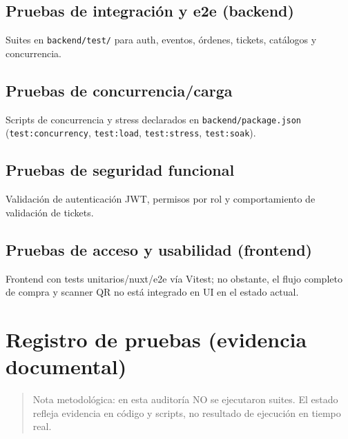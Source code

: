 \documentclass[
  11pt,
  a4paper,
  twoside=false,
  parskip=half               %
]{scrreprt}                  %
\begin{document}
\hypertarget{pruebas-de-integraciuxf3n-y-e2e-backend}{%
\subsection{Pruebas de integración y e2e
(backend)}\label{pruebas-de-integraciuxf3n-y-e2e-backend}}

Suites en \texttt{backend/test/} para auth, eventos, órdenes, tickets,
catálogos y concurrencia.

\hypertarget{pruebas-de-concurrenciacarga}{%
\subsection{Pruebas de
concurrencia/carga}\label{pruebas-de-concurrenciacarga}}

Scripts de concurrencia y stress declarados en
\texttt{backend/package.json} (\texttt{test:concurrency},
\texttt{test:load}, \texttt{test:stress}, \texttt{test:soak}).

\hypertarget{pruebas-de-seguridad-funcional}{%
\subsection{Pruebas de seguridad
funcional}\label{pruebas-de-seguridad-funcional}}

Validación de autenticación JWT, permisos por rol y comportamiento de
validación de tickets.

\hypertarget{pruebas-de-acceso-y-usabilidad-frontend}{%
\subsection{Pruebas de acceso y usabilidad
(frontend)}\label{pruebas-de-acceso-y-usabilidad-frontend}}

Frontend con tests unitarios/nuxt/e2e vía Vitest; no obstante, el flujo
completo de compra y scanner QR no está integrado en UI en el estado
actual.

\hypertarget{registro-de-pruebas-evidencia-documental}{%
\section{Registro de pruebas (evidencia
documental)}\label{registro-de-pruebas-evidencia-documental}}

\begin{quote}
Nota metodológica: en esta auditoría NO se ejecutaron suites. El estado
refleja evidencia en código y scripts, no resultado de ejecución en
tiempo real.
\end{quote}
\end{document}
